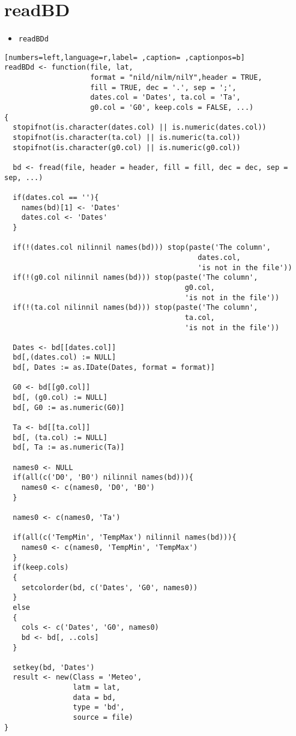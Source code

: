 \section{readBD}
\label{sec:orgf0dbe48}
\begin{itemize}
\item \texttt{readBDd}
\end{itemize}
\begin{lstlisting}[numbers=left,language=r,label= ,caption= ,captionpos=b]
readBDd <- function(file, lat,
                    format = "nild/nilm/nilY",header = TRUE,
                    fill = TRUE, dec = '.', sep = ';',
                    dates.col = 'Dates', ta.col = 'Ta',
                    g0.col = 'G0', keep.cols = FALSE, ...)
{
  stopifnot(is.character(dates.col) || is.numeric(dates.col))
  stopifnot(is.character(ta.col) || is.numeric(ta.col))
  stopifnot(is.character(g0.col) || is.numeric(g0.col))

  bd <- fread(file, header = header, fill = fill, dec = dec, sep = sep, ...)

  if(dates.col == ''){
    names(bd)[1] <- 'Dates'
    dates.col <- 'Dates'
  }

  if(!(dates.col nilinnil names(bd))) stop(paste('The column',
                                             dates.col,
                                             'is not in the file'))
  if(!(g0.col nilinnil names(bd))) stop(paste('The column',
                                          g0.col,
                                          'is not in the file'))
  if(!(ta.col nilinnil names(bd))) stop(paste('The column',
                                          ta.col,
                                          'is not in the file'))

  Dates <- bd[[dates.col]]
  bd[,(dates.col) := NULL]
  bd[, Dates := as.IDate(Dates, format = format)]

  G0 <- bd[[g0.col]]
  bd[, (g0.col) := NULL]
  bd[, G0 := as.numeric(G0)]

  Ta <- bd[[ta.col]]
  bd[, (ta.col) := NULL]
  bd[, Ta := as.numeric(Ta)]

  names0 <- NULL
  if(all(c('D0', 'B0') nilinnil names(bd))){
    names0 <- c(names0, 'D0', 'B0')
  }

  names0 <- c(names0, 'Ta')

  if(all(c('TempMin', 'TempMax') nilinnil names(bd))){
    names0 <- c(names0, 'TempMin', 'TempMax')
  }
  if(keep.cols)
  {
    setcolorder(bd, c('Dates', 'G0', names0))
  }
  else
  {
    cols <- c('Dates', 'G0', names0)
    bd <- bd[, ..cols]
  }

  setkey(bd, 'Dates')
  result <- new(Class = 'Meteo',
                latm = lat,
                data = bd,
                type = 'bd',
                source = file)
}
\end{lstlisting}
